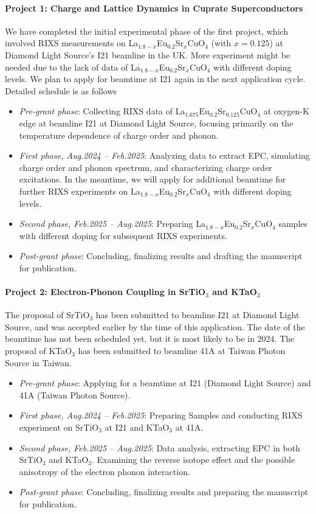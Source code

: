\documentclass[11pt]{article}
\begin{document}
\paragraph{Project 1: Charge and Lattice Dynamics in Cuprate Superconductors}
We have completed the initial experimental phase of the first project, which involved RIXS measurements on {La$_{1.8-x}$Eu$_{0.2}$Sr$_x$CuO$_{4}$} (with $x=0.125$) at Diamond Light Source's I21 beamline in the UK. More experiment might be needed due to the lack of data of {La$_{1.8-x}$Eu$_{0.2}$Sr$_x$CuO$_{4}$} with different doping levels. We plan to apply for beamtime at I21 again in the next application cycle. Detailed schedule is as follows
\begin{itemize}
  \item \textit{Pre-grant phase}: Collecting RIXS data of $\mathrm{La_{1.675}Eu_{0.2}Sr_{0.125}CuO_{4}}$ at oxygen-K edge at beamline I21 at Diamond Light Source, focusing primarily on the temperature dependence of charge order and phonon. 
  \item \textit{First phase, Aug.2024 -- Feb.2025}: Analyzing data to extract EPC, simulating charge order and phonon spectrum, and characterizing charge order excitations. In the meantime, we will apply for additional beamtime for further RIXS experiments on {La$_{1.8-x}$Eu$_{0.2}$Sr$_x$CuO$_{4}$} with different doping levels. 
  \item \textit{Second phase, Feb.2025 -- Aug.2025}: Preparing {La$_{1.8-x}$Eu$_{0.2}$Sr$_x$CuO$_{4}$} samples with different doping for subsequent RIXS experiments. 
  \item \textit{Post-grant phase}: Concluding,  finalizing results and drafting the manuscript for publication.
\end{itemize}

\paragraph{Project 2: Electron-Phonon Coupling in SrTiO$_{3}$ and KTaO$_{3}$}
The proposal of SrTiO$_{3}$ has been submitted to beamline I21 at Diamond Light Source, and was accepted earlier by the time of this application. The date of the beamtime has not been scheduled yet, but it is most likely to be in 2024. The proposal of KTaO$_{3}$ has been submitted to beamline 41A at Taiwan Photon Source in Taiwan. 
\begin{itemize}
  \item \textit{Pre-grant phase}: Applying for a beamtime at I21 (Diamond Light Source) and 41A (Taiwan Photon Source).
  \item \textit{First phase, Aug.2024 -- Feb.2025}: Preparing Samples and conducting RIXS experiment on SrTiO$_{3}$ at I21 and KTaO$_{3}$ at 41A. 
  \item \textit{Second phase, Feb.2025 -- Aug.2025}: Data analysis, extracting EPC in both SrTiO$_{3}$ and KTaO$_{3}$. Examining the reverse isotope effect and the possible anisotropy of the electron phonon interaction.
  \item \textit{Post-grant phase}:  Concluding,  finalizing results and preparing the manuscript for publication.
\end{itemize}
\end{document}
